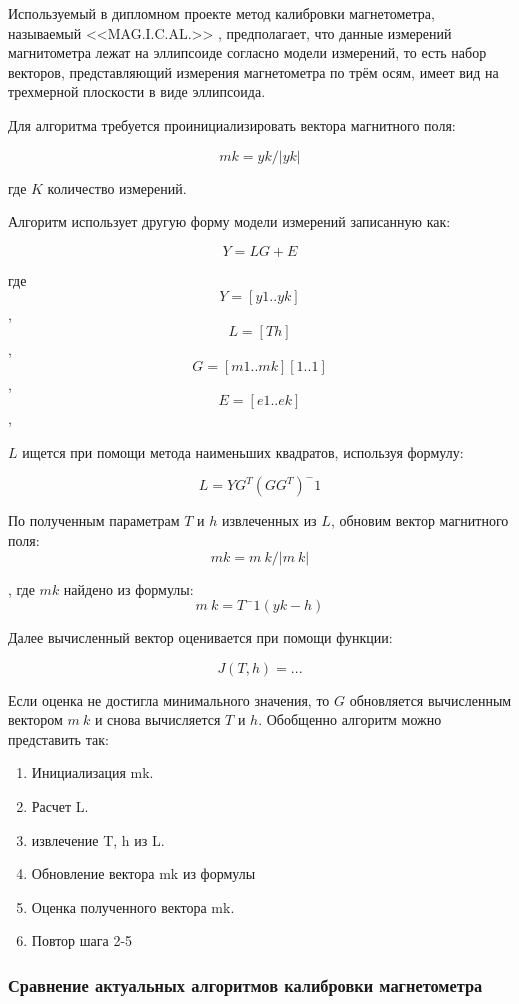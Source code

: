 Используемый в дипломном проекте метод калибровки магнетометра, называемый <<MAG.I.C.AL.>> , предполагает, что данные измерений магнитометра
лежат на эллипсоиде согласно модели измерений, то есть набор векторов, представляющий измерения магнетометра по трём осям, 
имеет вид на трехмерной плоскости в виде эллипсоида. %

Для алгоритма требуется проинициализировать вектора магнитного поля:

$$ mk = yk/|yk| $$

где $K$ количество измерений.

Алгоритм использует другую форму модели измерений записанную как:

$$ Y = LG + E $$

где
$$ Y = [y1..yk] $$,
$$ L = [T h] $$,
$$ G = [m1..mk][1..1] $$,
$$ E = [e1..ek] $$,

$L$ ищется при помощи метода наименьших квадратов, используя формулу:

$$ L=YG^T(GG^T)^-1$$

По полученным параметрам $T$ и $h$ извлеченных из $L$, обновим вектор магнитного поля:
$$ mk = m~k/|m~k| $$

, где $mk$ найдено из формулы:  
$$ m~k = T^-1(yk - h) $$

Далее вычисленный вектор оценивается при помощи функции:

$$ J(T, h) = ... $$

Если оценка не достигла минимального значения, то $G$ обновляется вычисленным вектором $m~k$ и снова вычисляется $T$ и $h$.
Обобщенно алгоритм можно представить так:
\begin{enumerate}
    \item Инициализация mk.
    \item Расчет L.
    \item извлечение T, h из L.
    \item Обновление вектора mk из формулы 
    \item Оценка полученного вектора mk.
    \item Повтор шага 2-5
\end{enumerate}

\subsubsection{Сравнение актуальных алгоритмов калибровки магнетометра}

